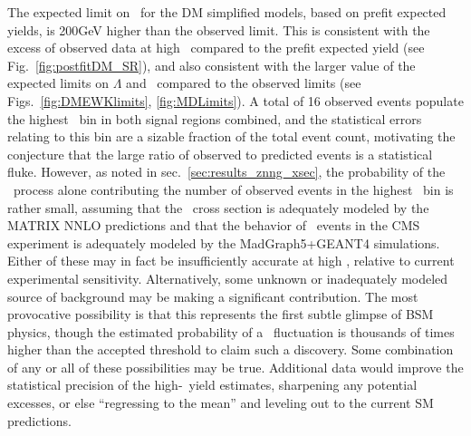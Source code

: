 The expected limit on \mmed\ for the DM simplified models, based on prefit expected yields,
is 200\unit{GeV} higher than the observed limit. This is consistent with the excess of observed data at high \ETgamma\ compared to the prefit
expected yield (see Fig.~\ref{fig:postfitDM_SR}), and also consistent with the larger value of the expected limits on $\Lambda$ and \mD\ compared
to the observed limits (see Figs.~\ref{fig:DMEWKlimits}, \ref{fig:MDLimits}). A total of 16 observed events populate the highest \ETgamma\ bin
in both signal regions combined, and the statistical errors relating to this bin are a sizable fraction of the total event count, motivating the
conjecture that the large ratio of observed to predicted events is a statistical fluke. However, as noted in sec.~\ref{sec:results_znng_xsec}, the probability
of the \zinvg\ process alone contributing the number of observed events in the highest \ETgamma\ bin is rather small, assuming that the \zinvg\ cross
section is adequately modeled by the MATRIX NNLO predictions and that the behavior of \zinvg\ events in the CMS experiment is adequately modeled
by the MadGraph5+GEANT4 simulations. Either of these may in fact be insufficiently accurate at high \pTgamma, relative to current experimental
sensitivity. Alternatively, some unknown or inadequately modeled source of background may be making a significant contribution. The most
provocative possibility is that this represents the first subtle glimpse of BSM physics, though the estimated probability of a \zinvg\ fluctuation
is thousands of times higher than the accepted threshold to claim such a discovery. Some combination of any or all of these possibilities may be true.
Additional data would improve the statistical precision of the high-\ETgamma\ yield estimates, sharpening any potential excesses, or else
``regressing to the mean'' and leveling out to the current SM predictions.

